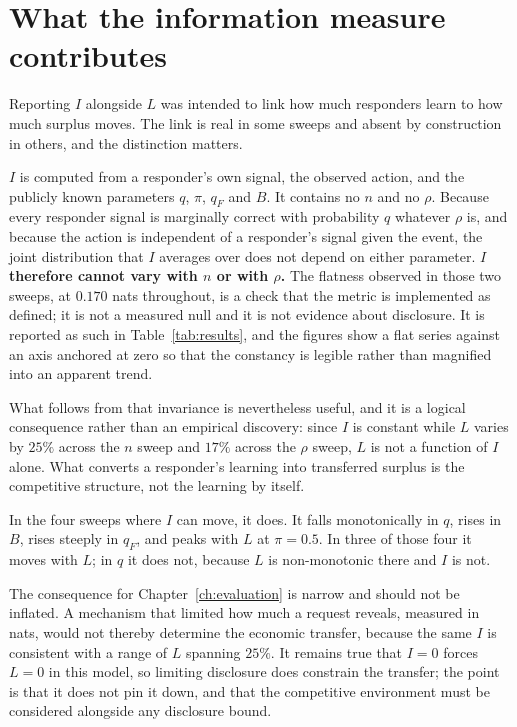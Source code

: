 \section{What the information measure contributes}
\label{sec:res-info}

Reporting $I$ alongside $L$ was intended to link how much responders learn to how much
surplus moves. The link is real in some sweeps and absent by construction in others, and the
distinction matters.

$I$ is computed from a responder's own signal, the observed action, and the publicly known
parameters $q$, $\pi$, $q_F$ and $B$. It contains no $n$ and no $\rho$. Because every
responder signal is marginally correct with probability $q$ whatever $\rho$ is, and because
the action is independent of a responder's signal given the event, the joint distribution
that $I$ averages over does not depend on either parameter. \textbf{$I$ therefore cannot vary with
$n$ or with $\rho$.} The flatness observed in those two sweeps, at $0.170$ nats throughout,
is a check that the metric is implemented as defined; it is not a measured null and it is
not evidence about disclosure. It is reported as such in Table~\ref{tab:results}, and the
figures show a flat series against an axis anchored at zero so that the constancy is legible
rather than magnified into an apparent trend.

What follows from that invariance is nevertheless useful, and it is a logical consequence
rather than an empirical discovery: since $I$ is constant while $L$ varies by $25\%$ across
the $n$ sweep and $17\%$ across the $\rho$ sweep, $L$ is not a function of $I$ alone. What
converts a responder's learning into transferred surplus is the competitive structure, not
the learning by itself.

In the four sweeps where $I$ can move, it does. It falls monotonically in $q$, rises in $B$,
rises steeply in $q_F$, and peaks with $L$ at $\pi = 0.5$. In three of those four it moves
with $L$; in $q$ it does not, because $L$ is non-monotonic there and $I$ is not.

The consequence for Chapter~\ref{ch:evaluation} is narrow and should not be inflated. A
mechanism that limited how much a request reveals, measured in nats, would not thereby
determine the economic transfer, because the same $I$ is consistent with a range of $L$
spanning $25\%$. It remains true that $I = 0$ forces $L = 0$ in this model, so limiting
disclosure does constrain the transfer; the point is that it does not pin it down, and that
the competitive environment must be considered alongside any disclosure bound.

